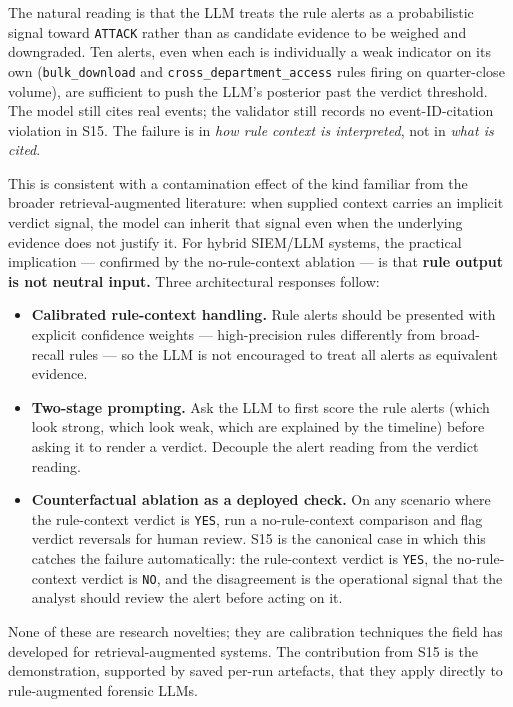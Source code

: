 \documentclass[conference]{IEEEtran}
\begin{document}
The natural reading is that the LLM treats the rule alerts as a probabilistic signal toward \texttt{ATTACK} rather than as candidate evidence to be weighed and downgraded. Ten alerts, even when each is individually a weak indicator on its own (\texttt{bulk\_download} and \texttt{cross\_department\_access} rules firing on quarter-close volume), are sufficient to push the LLM's posterior past the verdict threshold. The model still cites real events; the validator still records no event-ID-citation violation in S15. The failure is in \emph{how rule context is interpreted}, not in \emph{what is cited}.

This is consistent with a contamination effect of the kind familiar from the broader retrieval-augmented literature: when supplied context carries an implicit verdict signal, the model can inherit that signal even when the underlying evidence does not justify it. For hybrid SIEM/LLM systems, the practical implication --- confirmed by the no-rule-context ablation --- is that \textbf{rule output is not neutral input.} Three architectural responses follow:

\begin{itemize}
  \item \textbf{Calibrated rule-context handling.} Rule alerts should be presented with explicit confidence weights --- high-precision rules differently from broad-recall rules --- so the LLM is not encouraged to treat all alerts as equivalent evidence.
  \item \textbf{Two-stage prompting.} Ask the LLM to first score the rule alerts (which look strong, which look weak, which are explained by the timeline) before asking it to render a verdict. Decouple the alert reading from the verdict reading.
  \item \textbf{Counterfactual ablation as a deployed check.} On any scenario where the rule-context verdict is \texttt{YES}, run a no-rule-context comparison and flag verdict reversals for human review. S15 is the canonical case in which this catches the failure automatically: the rule-context verdict is \texttt{YES}, the no-rule-context verdict is \texttt{NO}, and the disagreement is the operational signal that the analyst should review the alert before acting on it.
\end{itemize}

None of these are research novelties; they are calibration techniques the field has developed for retrieval-augmented systems. The contribution from S15 is the demonstration, supported by saved per-run artefacts, that they apply directly to rule-augmented forensic LLMs.
\end{document}
